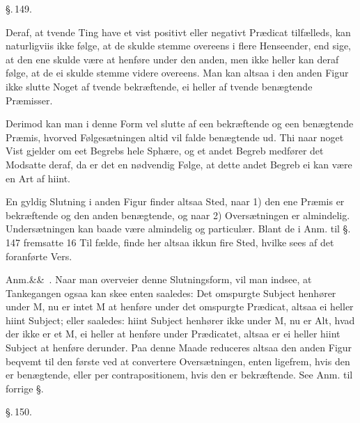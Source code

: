 \documentclass[12pt]{book}
\def\sperr#1{#1}%
\def\textit#1{#1}%
\newcommand{\sperr}[1]{\textls[180]{#1}}
\newcommand{\parag}[1]{%
  \par\vspace{0.9\baselineskip}%
  {\centering\textit{\S.\,#1.}\par}%
  \vspace{0.35\baselineskip}%
  \noindent\hspace{\parindent}\ignorespaces
}
\newcommand{\anm}[1]{%
  \par\vspace{0.5\baselineskip}%
  \noindent\hspace{\parindent}\sperr{Anm.}\ifx&#1&\else~\textit{#1}.\fi
  \enspace\ignorespaces
}
\newcommand{\opage}[1]{\marginnote{\footnotesize\textit{[#1]}}}
\begin{document}
\parag{149}

Deraf, at tvende Ting have et vist positivt eller negativt Prædicat tilfælleds,
kan naturligviis ikke følge, at de skulde stemme overeens i flere Henseender,
end sige, at den ene skulde være at henføre under den anden, men ikke heller
kan deraf følge, at de ei skulde stemme videre overeens. Man kan altsaa i den
anden Figur ikke slutte Noget af tvende bekræftende, ei heller af tvende
benægtende Præmisser.

Derimod kan man i denne Form vel slutte af een bekræftende og een benægtende
Præmis, hvorved Følgesætningen altid vil falde benægtende ud. Thi naar noget
Vist gjelder om eet Begrebs hele Sphære, og et andet Begreb medfører det
Modsatte deraf, da er det en nødvendig Følge, at dette andet Begreb ei kan være
en Art af hiint.

En gyldig Slutning i anden Figur finder altsaa Sted, naar 1) den ene Præmis er
bekræftende og den anden benægtende, og naar 2) Oversætningen er almindelig.
Undersætningen kan baade være almindelig og particulær. Blant de i Anm. til
§. 147 fremsatte 16 Til%
\opage{342}fælde, finde her altsaa ikkun fire Sted, hvilke sees af det foranførte Vers.

\anm{} Naar man overveier denne Slutningsform, vil man indsee, at Tankegangen
ogsaa kan skee enten saaledes: Det omspurgte Subject henhører under
\textit{M}, nu er intet \textit{M} at henføre under det omspurgte Prædicat,
altsaa ei heller hiint Subject; eller saaledes: hiint Subject henhører ikke
under \textit{M}, nu er Alt, hvad der ikke er et \textit{M}, ei heller at
henføre under Prædicatet, altsaa er ei heller hiint Subject at henføre
derunder. Paa denne Maade reduceres altsaa den anden Figur beqvemt til den
første ved at convertere Oversætningen, enten ligefrem, hvis den er
benægtende, eller \textit{per contrapositionem}, hvis den er bekræftende. See
Anm. til forrige §.

\parag{150}
\end{document}
